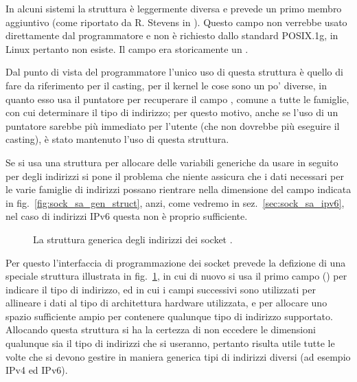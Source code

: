 In alcuni sistemi la struttura è leggermente diversa e prevede un primo membro
aggiuntivo  (come riportato da R. Stevens in
\cite{UNP1}). Questo campo non verrebbe usato direttamente dal programmatore e
non è richiesto dallo standard POSIX.1g, in Linux pertanto non esiste. Il
campo  era storicamente un .

Dal punto di vista del programmatore l'unico uso di questa struttura è quello
di fare da riferimento per il casting, per il kernel le cose sono un po'
diverse, in quanto esso usa il puntatore per recuperare il campo
, comune a tutte le famiglie, con cui determinare il tipo di
indirizzo; per questo motivo, anche se l'uso di un puntatore 
sarebbe più immediato per l'utente (che non dovrebbe più eseguire il casting),
è stato mantenuto l'uso di questa struttura.

Se si usa una struttura  per allocare delle variabili
generiche da usare in seguito per degli indirizzi si pone il problema che
niente assicura che i dati necessari per le varie famiglie di indirizzi
possano rientrare nella dimensione del campo  indicata in
fig.~\ref{fig:sock_sa_gen_struct}, anzi, come vedremo in
sez.~\ref{sec:sock_sa_ipv6}, nel caso di indirizzi IPv6 questa non è proprio
sufficiente. 

\begin{figure}[!htb]
  \footnotesize \centering
  \begin{minipage}[c]{0.95\textwidth}
  \end{minipage} 
  \caption{La struttura generica degli indirizzi dei socket
    .} 
  \label{fig:sock_sa_storage_struct}
\end{figure}

Per questo l'interfaccia di programmazione dei socket prevede la defizione di
una speciale struttura  illustrata in
fig.~\ref{fig:sock_sa_storage_struct}, in cui di nuovo si usa il primo campo
() per indicare il tipo di indirizzo, ed in cui i campi
successivi sono utilizzati per allineare i dati al tipo di architettura
hardware utilizzata, e per allocare uno spazio sufficiente ampio per contenere
qualunque tipo di indirizzo supportato. Allocando questa struttura si ha la
certezza di non eccedere le dimensioni qualunque sia il tipo di indirizzi che
si useranno, pertanto risulta utile tutte le volte che si devono gestire in
maniera generica tipi di indirizzi diversi (ad esempio IPv4 ed IPv6).


